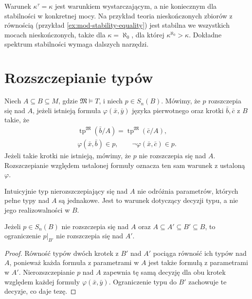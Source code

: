 Warunek $\kappa^\tau=\kappa$ jest warunkiem
wystarczającym, a nie koniecznym dla stabilności
w konkretnej mocy. Na przykład teoria
nieskończonych zbiorów z równością
(przykład \ref{ex:mod-stability-equality})
jest stabilna we wszystkich mocach nieskończonych,
także dla $\kappa=\aleph_0$, dla której
$\kappa^{\aleph_0}>\kappa$.
Dokładne spektrum stabilności wymaga
dalszych narzędzi.

\section{Rozszczepianie typów}

\begin{definicja}
\label{def:mod-splitting}
Niech $A\subseteq B\subseteq M$, gdzie
$\mathfrak M\models T$, i niech $p\in S_n(B)$.
Mówimy, że $p$ rozszczepia się nad $A$, jeżeli
istnieją formuła $\varphi(\bar x,\bar y)$
języka pierwotnego oraz krotki $\bar b,\bar c$
z $B$ takie, że
\[
\begin{gathered}
\operatorname{tp}^{\mathfrak M}(\bar b/A)
=\operatorname{tp}^{\mathfrak M}(\bar c/A),\\
\varphi(\bar x,\bar b)\in p,\qquad
\neg\varphi(\bar x,\bar c)\in p.
\end{gathered}
\]
Jeżeli takie krotki nie istnieją, mówimy,
że $p$ nie rozszczepia się nad $A$.
Rozszczepianie względem ustalonej formuły
oznacza ten sam warunek z ustaloną $\varphi$.
\end{definicja}

Intuicyjnie typ nierozszczepiający się nad $A$
nie odróżnia parametrów, których pełne typy
nad $A$ są jednakowe. Jest to warunek dotyczący
decyzji typu, a nie jego realizowalności w $B$.

\begin{lemat}
\label{lem:mod-nonsplitting-monotonicity}
Jeżeli $p\in S_n(B)$ nie rozszczepia się nad $A$
oraz $A\subseteq A'\subseteq B'\subseteq B$,
to ograniczenie $p|_{B'}$ nie rozszczepia się
nad $A'$.
\end{lemat}
\begin{proof}
Równość typów dwóch krotek z $B'$ nad $A'$
pociąga równość ich typów nad $A$, ponieważ
każda formuła z parametrami w $A$ jest także
formułą z parametrami w $A'$.
Nierozszczepianie $p$ nad $A$ zapewnia tę samą
decyzję dla obu krotek względem każdej formuły
$\varphi(\bar x,\bar y)$.
Ograniczenie typu do $B'$ zachowuje te decyzje,
co daje tezę.
\end{proof}


